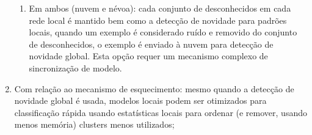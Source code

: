 \begin{enumerate}
\begin{enumerate}
    \item Em ambos (nuvem e névoa): cada conjunto de desconhecidos em cada rede
    local é mantido bem como a detecção de novidade para padrões locais,
    quando um exemplo é considerado ruído e removido do conjunto de
    desconhecidos, o exemplo é enviado à nuvem para detecção de novidade global.
    Esta opção requer um mecanismo complexo de sincronização de modelo.

  \end{enumerate}
    
  \item Com relação ao mecanismo de esquecimento:
  mesmo quando a detecção de novidade global é usada, modelos locais podem
  ser otimizados para classificação rápida usando estatísticas locais para
  ordenar (e remover, usando menos memória) clusters menos utilizados;


\end{enumerate}
